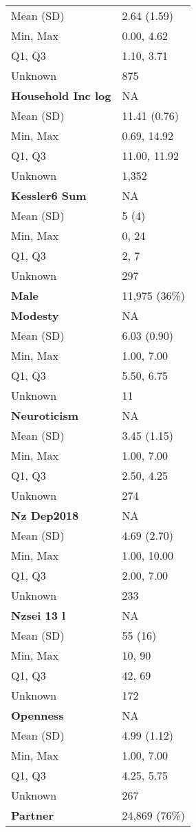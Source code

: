 \documentclass[
  single column]{article}
\begin{document}
\begin{longtable}[]{@{}ll@{}}
Mean (SD) & 2.64 (1.59) \\
Min, Max & 0.00, 4.62 \\
Q1, Q3 & 1.10, 3.71 \\
Unknown & 875 \\
\textbf{Household Inc log} & NA \\
Mean (SD) & 11.41 (0.76) \\
Min, Max & 0.69, 14.92 \\
Q1, Q3 & 11.00, 11.92 \\
Unknown & 1,352 \\
\textbf{Kessler6 Sum} & NA \\
Mean (SD) & 5 (4) \\
Min, Max & 0, 24 \\
Q1, Q3 & 2, 7 \\
Unknown & 297 \\
\textbf{Male} & 11,975 (36\%) \\
\textbf{Modesty} & NA \\
Mean (SD) & 6.03 (0.90) \\
Min, Max & 1.00, 7.00 \\
Q1, Q3 & 5.50, 6.75 \\
Unknown & 11 \\
\textbf{Neuroticism} & NA \\
Mean (SD) & 3.45 (1.15) \\
Min, Max & 1.00, 7.00 \\
Q1, Q3 & 2.50, 4.25 \\
Unknown & 274 \\
\textbf{Nz Dep2018} & NA \\
Mean (SD) & 4.69 (2.70) \\
Min, Max & 1.00, 10.00 \\
Q1, Q3 & 2.00, 7.00 \\
Unknown & 233 \\
\textbf{Nzsei 13 l} & NA \\
Mean (SD) & 55 (16) \\
Min, Max & 10, 90 \\
Q1, Q3 & 42, 69 \\
Unknown & 172 \\
\textbf{Openness} & NA \\
Mean (SD) & 4.99 (1.12) \\
Min, Max & 1.00, 7.00 \\
Q1, Q3 & 4.25, 5.75 \\
Unknown & 267 \\
\textbf{Partner} & 24,869 (76\%) \\

\end{longtable}
\end{document}
